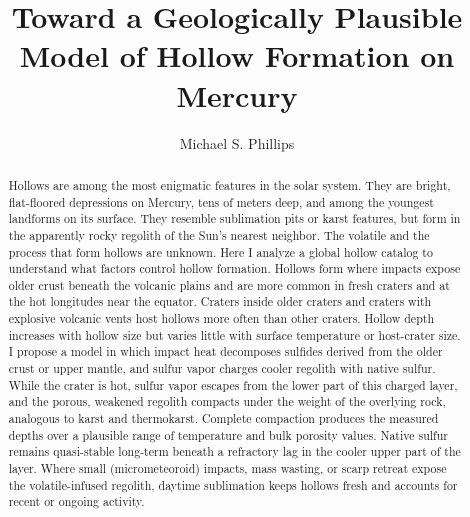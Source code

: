 \documentclass[article,review]{planetary}
\title{Toward a Geologically Plausible Model of Hollow Formation on Mercury}
\author[1]{Michael S. Phillips \orcid{0000-0001-8873-2238}}
\affil[1]{Lunar and Planetary Laboratory, University of Arizona, Tucson, AZ, USA, https://ror.org/03m2x1q45}
\date{}
\begin{document}
\maketitle
\thispagestyle{firstpage}

\correspondingauthor

\submissiondate{}

\mstype{\articletype}



\stitle{\insertshorttitle}


\begin{abstract}
Hollows are among the most enigmatic features in the solar system. They are bright, flat-floored depressions on Mercury, tens of meters deep, and among the youngest landforms on its surface. They resemble sublimation pits or karst features, but form in the apparently rocky regolith of the Sun's nearest neighbor. The volatile and the process that form hollows are unknown. Here I analyze a global hollow catalog to understand what factors control hollow formation. Hollows form where impacts expose older crust beneath the volcanic plains and are more common in fresh craters and at the hot longitudes near the equator. Craters inside older craters and craters with explosive volcanic vents host hollows more often than other craters. Hollow depth increases with hollow size but varies little with surface temperature or host-crater size. I propose a model in which impact heat decomposes sulfides derived from the older crust or upper mantle, and sulfur vapor charges cooler regolith with native sulfur. While the crater is hot, sulfur vapor escapes from the lower part of this charged layer, and the porous, weakened regolith compacts under the weight of the overlying rock, analogous to karst and thermokarst. Complete compaction produces the measured depths over a plausible range of temperature and bulk porosity values. Native sulfur remains quasi-stable long-term beneath a refractory lag in the cooler upper part of the layer. Where small (micrometeoroid) impacts, mass wasting, or scarp retreat expose the volatile-infused regolith, daytime sublimation keeps hollows fresh and accounts for recent or ongoing activity.
\end{abstract}
\end{document}
